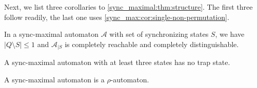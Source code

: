 Next, we list three corollaries to \cref{sync_maximal:thm:structure}. The first three follow readily,
the last one uses \cref{sync_max:cor:single-non-permutation}.

\begin{corollary}
	In a sync-maximal automaton $\mathcal A$
	with set of synchronizing states $S$,
	we have $|Q \setminus S| \le 1$
	and $\mathcal A_{|S}$
	is completely reachable
	and completely distinguishable.
\end{corollary}

\begin{corollary} \label{syncmax:cor:three-states-trap-not-syncmax}
A sync-maximal automaton with at least
three states has no trap state.
\end{corollary} 

\begin{corollary}
	A sync-maximal automaton is a $\rho$-automaton.
\end{corollary}

